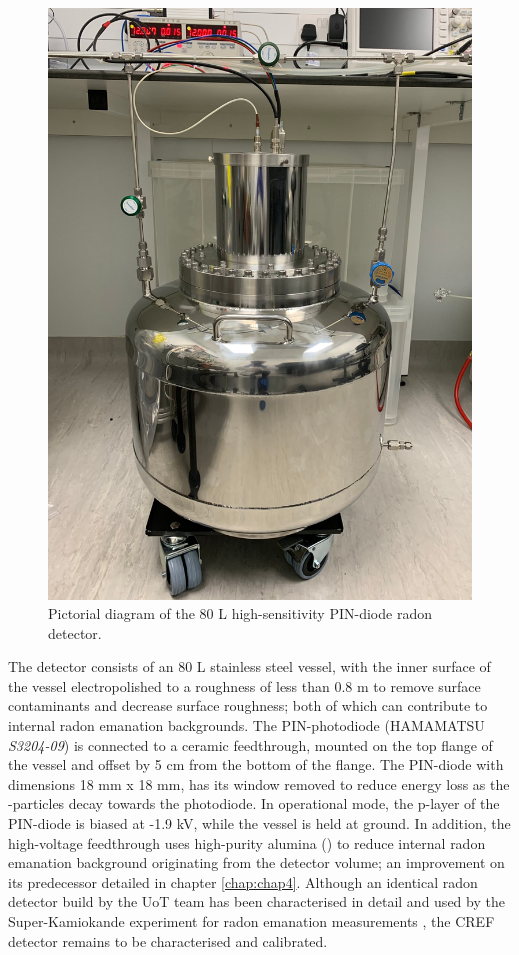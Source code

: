 \begin{figure}[h!]
    \centering
    \includegraphics[scale=0.1]{Chapter_7/Figures/detector_image.pdf}
    \caption[Pictorial diagram of the 80 L high-sensitivity PIN-diode radon detector.]%
    {Pictorial diagram of the 80 L high-sensitivity PIN-diode radon detector.}
    \label{fig:cref_detector}
\end{figure}
%

The detector consists of an 80 L stainless steel vessel, with the inner surface of the vessel electropolished to a roughness of less than 0.8 \micro{}m to remove surface contaminants and decrease surface roughness; both of which can contribute to internal radon emanation backgrounds. The PIN-photodiode (HAMAMATSU \textit{S3204-09}) is connected to a ceramic feedthrough, mounted on the top flange of the vessel and offset by 5 cm from the bottom of the flange. The PIN-diode with dimensions 18 mm x 18 mm, has its window removed to reduce energy loss as the \alpha-particles decay towards the photodiode. In operational mode, the p-layer of the PIN-diode is biased at -1.9 kV, while the vessel is held at ground. In addition, the high-voltage feedthrough uses high-purity alumina (\alumina{}) to reduce internal radon emanation background originating from the detector volume; an improvement on its predecessor detailed in chapter \ref{chap:chap4}. Although an identical radon detector build by the UoT team has been characterised in detail and used by the Super-Kamiokande experiment for radon emanation measurements \cite{Hosokawa:2015koa, Nakano:2017rsy}, the CREF detector remains to be characterised and calibrated.


